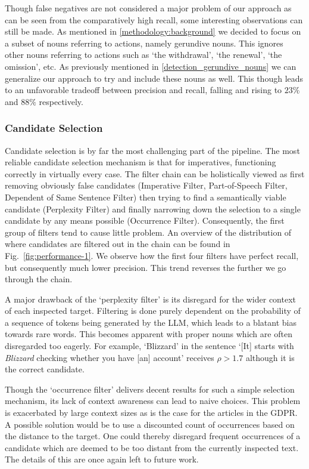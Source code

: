 \documentclass[times, 10pt,twocolumn]{article}
\begin{document}
Though false negatives are not considered a major problem of our approach as can be seen from the
comparatively high recall, some interesting observations can still be made. As mentioned in
\ref{methodology:background} we decided to focus on a subset of nouns referring to actions,
namely gerundive nouns. This ignores other nouns referring to actions such as `the withdrawal',
`the renewal', `the omission', etc. As previously mentioned in \ref{detection_gerundive_nouns}
we can generalize our approach to try and include these nouns as well. This though leads
to an unfavorable tradeoff between precision and recall, falling and rising to \(23\%\) and \(88\%\)
respectively. 


\subsubsection{Candidate Selection}
Candidate selection is by far the most challenging part of the pipeline. The most reliable
candidate selection mechanism is that for imperatives, functioning correctly in virtually
every case.
The filter chain can be holistically viewed as first removing obviously false candidates
(Imperative Filter, Part-of-Speech Filter, Dependent of Same Sentence Filter) then trying to
find a semantically viable candidate (Perplexity Filter) and finally narrowing down the
selection to a single candidate by any means possible (Occurrence Filter). Consequently, the first group of
filters tend to cause little problem.
An overview of the distribution of where candidates are filtered out in the chain
can be found in Fig.~\ref{fig:performance-1}. We observe how the first four filters
have perfect recall, but consequently much lower precision. This trend reverses the further
we go through the chain.

A major drawback of the `perplexity filter' is its disregard for the wider context of each
inspected target. Filtering is done purely dependent on the probability of a sequence of
tokens being generated by the LLM, which leads to a blatant bias towards rare words. This becomes
apparent with proper nouns which are often disregarded too eagerly. For example, `Blizzard'
in the sentence `[It] starts with \textit{Blizzard} checking whether you have [an] account'
receives \(\rho > 1.7\) although it is the correct candidate.

Though the `occurrence filter' delivers decent results for such a simple selection mechanism,
its lack of context awareness can lead to naive choices. This problem is exacerbated by
large context sizes as is the case for the articles in the GDPR. A possible solution
would be to use a discounted count of occurrences based on the distance to the target.
One could thereby disregard frequent occurrences of a candidate which are deemed
to be too distant from the currently inspected text. The details of this are
once again left to future work.
\end{document}
